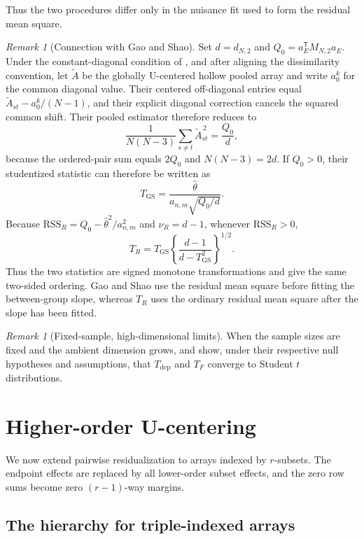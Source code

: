 \documentclass[11pt]{article}
\theoremstyle{plain}
\theoremstyle{definition}
\theoremstyle{remark}
\newtheorem{remark}[theorem]{Remark}
\begin{document}
Thus the two procedures differ only in the nuisance fit used to form the
residual mean square.

\begin{remark}[Connection with Gao and Shao]
\label{rem:gao-shao}
Set $d=d_{N,2}$ and $Q_0=a_E^\mathsf TM_{N,2}a_E$.  Under the
constant-diagonal condition of \citet{GaoShao2023}, and after aligning the
dissimilarity convention, let $\widetilde A$ be the globally U-centered
hollow pooled array and write $a_0^k$ for the common diagonal value.  Their
centered off-diagonal entries equal
$\widetilde A_{st}-a_0^k/(N-1)$, and their explicit diagonal correction
cancels the squared common shift.  Their pooled estimator therefore reduces
to
\[
 \frac{1}{N(N-3)}\sum_{s\ne t}\widetilde A_{st}^{\,2}
 =\frac{Q_0}{d},
\]
because the ordered-pair sum equals $2Q_0$ and $N(N-3)=2d$.
If $Q_0>0$, their studentized statistic can therefore be written as
\[
 T_{\mathrm{GS}}
 =\frac{\widehat\theta}{a_{n,m}\sqrt{Q_0/d}}.
\]
Because $\mathrm{RSS}_R=Q_0-\widehat\theta^2/a_{n,m}^2$ and
$\nu_R=d-1$, whenever $\mathrm{RSS}_R>0$,
\[
 T_R=T_{\mathrm{GS}}
 \left\{\frac{d-1}{d-T_{\mathrm{GS}}^2}\right\}^{1/2}.
\]
Thus the two statistics are signed monotone transformations and give the same
two-sided ordering.  Gao and Shao use the residual mean square before fitting
the between-group slope, whereas $T_R$ uses the ordinary residual mean square
after the slope has been fitted.
\end{remark}

\begin{remark}[Fixed-sample, high-dimensional limits]
When the sample sizes are fixed and the ambient dimension grows,
\citet{ZhuZhangYaoShao2020} and \citet{ChakrabortyZhang2021} show, under their
respective null hypotheses and assumptions, that $T_{\mathrm{dep}}$ and $T_F$
converge to Student $t$ distributions.
\end{remark}

\section{Higher-order U-centering}
\label{sec:higher-order-u-centering}

We now extend pairwise residualization to arrays indexed by $r$-subsets.  The
endpoint effects are replaced by all lower-order subset effects, and the zero
row sums become zero $(r-1)$-way margins.

\subsection{\texorpdfstring{{The hierarchy for triple-indexed arrays}}{The hierarchy for triple-indexed arrays}}
\end{document}

